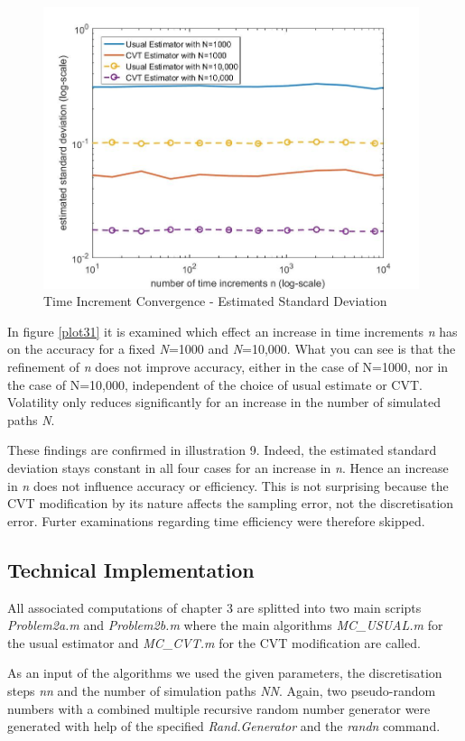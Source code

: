 \documentclass[a4paper,11pt]{article}
\begin{document}
{\begin{figure}[!h]
\centering
\includegraphics[width=11cm]{plot33.jpeg}
\caption{Time Increment Convergence - Estimated Standard Deviation}
\label{plot33}
\end{figure}

In figure \ref{plot31} it is  examined which effect an increase in time increments \textit{n} has on the accuracy for a fixed    \textit{N}=1000 and \textit{N}=10,000. What you can see is that the refinement of \textit{n} does not improve accuracy, either in the case of N=1000, nor in the case of N=10,000, independent of the choice of usual estimate or CVT. Volatility only reduces significantly for an increase in the number of simulated paths \textit{N}.

These findings are confirmed in illustration 9. Indeed, the estimated standard deviation stays constant in all four cases for an increase in \textit{n}. Hence an increase in \textit{n} does not influence accuracy or efficiency. This is not surprising because the CVT modification by its nature affects the sampling error, not the discretisation error. Furter examinations regarding time efficiency were therefore skipped.

\newpage
\subsection{Technical Implementation}
All associated computations of chapter 3 are splitted into two main scripts \textit{Problem2a.m} and \textit{Problem2b.m} where the main algorithms \textit{MC\_USUAL.m} for the usual estimator and \textit{MC\_CVT.m} for the CVT modification are called. 

As an input of the algorithms we used the given parameters, the discretisation steps \textit{nn} and the number of simulation paths \textit{NN}. Again, two pseudo-random numbers with a combined multiple recursive random number generator were generated with help of the specified \textit{Rand.Generator} and the \textit{randn} command.

}
\end{document}
